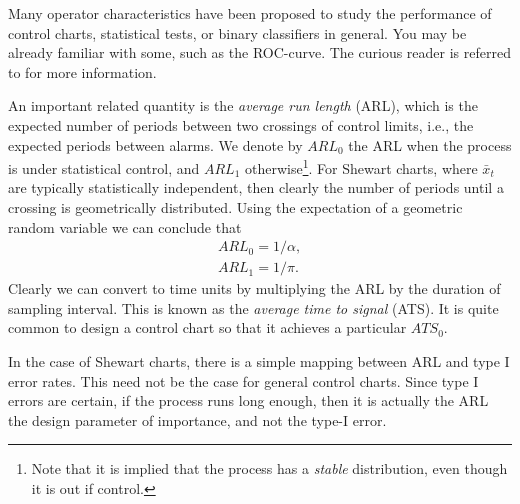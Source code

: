 \begin{extra}
Many operator characteristics have been proposed to study the performance of control charts, statistical tests, or binary classifiers in general.
You may be already familiar with some, such as the ROC-curve. 
The curious reader is referred to \cite{wikipedia_receiver_2015} for more information.
\end{extra}


An important related quantity is the \emph{average run length} (ARL), which is the expected number of periods between two crossings of control limits, i.e., the expected periods between alarms. 
We denote by $ARL_0$ the ARL when the process is under statistical control, and $ARL_1$ otherwise\footnote{Note that it is implied that the process has a \emph{stable} distribution, even though it is out if control.}. 
For Shewart charts, where $\bar{x}_t$ are typically statistically independent, then clearly the number of periods until a crossing is geometrically distributed. Using the expectation of a geometric random variable we can conclude that 
\begin{align}
	ARL_0=1/\alpha \label{eq:arl_0}, \\
	ARL_1=1/\pi \label{eq:arl_1}.
\end{align}
Clearly we can convert to time units by multiplying the ARL by the duration of sampling interval.
This is known as the \emph{average time to signal} (ATS).
It is quite common to design a control chart so that it achieves a particular $ATS_0$.

\begin{remark}
In the case of Shewart charts, there is a simple mapping between ARL and type I error rates.
This need not be the case for general control charts. 
Since type I errors are certain, if the process runs long enough, then it is actually the ARL the design parameter of importance, and not the type-I error.
\end{remark}


